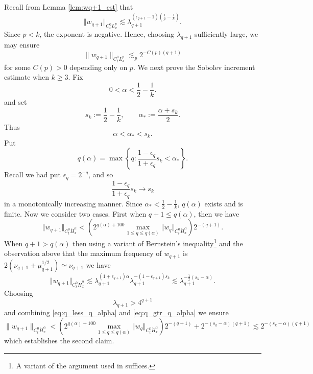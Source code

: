 \documentclass[12pt,reqno,letterpaper]{amsart}
\numberwithin{equation}{section}
\newcommand{\1}{{\bf 1}}
\newcommand{\2}{{\bf 2}}
\theoremstyle{remark}
\theoremstyle{remark}
\begin{document}
Recall from Lemma \ref{lem:wq+1_est} that
$$
\Vert w_{q+1} \Vert_{C_t^0 L^p_x} \lesssim \lambda_{q+1}^{(\epsilon_{q+1} - 1)\left(\frac{1}{p} - \frac{1}{k}\right)}.
$$
Since $p<k$, the exponent is negative. Hence, choosing $\lambda_{q+1}$ sufficiently large, we may ensure
\begin{equation}\label{eq:lambda-Lp-small}
    \|w_{q+1}\|_{C_t^0L_x^p}
    \lesssim_p
    2^{-C(p)(q+1)}
\end{equation}
for some $C(p) >0$ depending only on $p$. We next prove the Sobolev increment estimate when $k \ge 3$. Fix 
\[
    0<\alpha<\frac12-\frac1k.
\]
and set
\[
s_k := \frac12-\frac1k, \qquad \alpha_\ast:= \frac{\alpha +s_k}{2}.
\]
Thus
\[
\alpha < \alpha_\ast <s_k.
\]
Put
$$
q(\alpha) = \max \left\{q : \frac{1-\epsilon_q}{1 + \epsilon_q}s_k < \alpha_\ast \right\}.
$$
Recall we had put $\epsilon_q = 2^{-q}$, and so
$$
\frac{1 - \epsilon_q}{1 + \epsilon_q}s_k \to s_k
$$
in a monotonically increasing manner. Since $\alpha_* < \frac{1}{2} - \frac{1}{k}$, $q(\alpha)$ exists and is finite. Now we consider two cases. First when $q+1 \leq q(\alpha)$, then we have
\begin{equation}\label{eq:q_less_q_alpha}
    \Vert w_{q+1} \Vert_{C_t^0 \dot{H}_x^\alpha} < \left(2^{q(\alpha)+100} \max_{1 \leq q \leq q(\alpha)} \Vert w_q \Vert_{C_t^0 \dot{H}_x^\alpha}\right) 2^{-(q+1)}.
\end{equation}
When $q+1 > q(\alpha)$ then using a variant of Bernstein's inequality\footnote{A variant of the argument used in \cite[Lemma 5.8]{GR} suffices.} and the observation above that the maximum frequency of $w_{q+1}$ is $2(\nu_{q+1} + \mu_{q+1}^{1/2}) \simeq \nu_{q+1}$ we have
\begin{equation}\label{eq:q_gtr_q_alpha}
    \Vert w_{q+1} \Vert_{C_t^0 \dot{H}^\alpha_x} \lesssim \lambda_{q+1}^{(1 + \epsilon_{q+1})\alpha} \lambda_{q+1}^{-(1 - \epsilon_{q+1})s_k} \lesssim \lambda_{q+1}^{-\frac12(s_k -\alpha)}.
\end{equation}
Choosing
\begin{equation}\label{eq:sobolev_est_q_gtr_q_alpha}
    \lambda_{q+1} > 4^{q+1}
\end{equation}
and combining \eqref{eq:q_less_q_alpha} and \eqref{eq:q_gtr_q_alpha} we ensure
\begin{equation*}
    \|w_{q+1}\|_{C^0_t\dot{H}^\alpha_x} < \left(2^{q(\alpha)+100} \max_{1 \leq q \leq q(\alpha)} \Vert w_q \Vert_{C_t^0 \dot{H}_x^\alpha}\right) 2^{-(q+1)} + 2^{-(s_k-\alpha)(q+1)} \lesssim 2^{-(s_k-\alpha)(q+1)}
\end{equation*}
which establishes the second claim.
\end{document}
